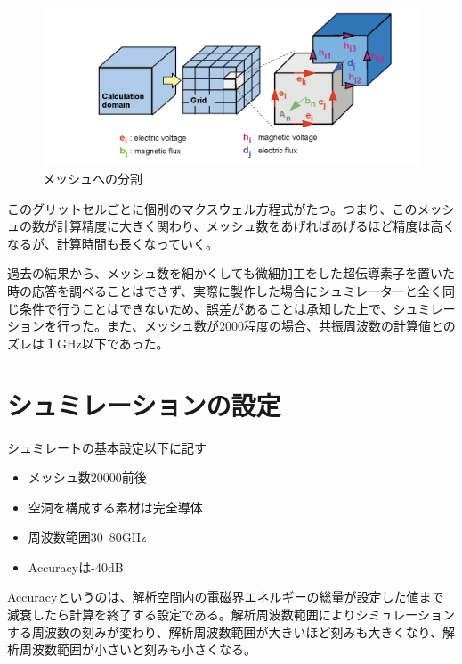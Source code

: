 \vspace{10 mm}

\begin{figure}[h]
  \begin{center}
    \includegraphics[width=12cm]{./image/mesh.png}
    \caption{メッシュへの分割}
    \label{fig:Mesh}
  \end{center}
\end{figure}

このグリットセルごとに個別のマクスウェル方程式がたつ。つまり、このメッシュの数が計算精度に大きく関わり、メッシュ数をあげればあげるほど精度は高くなるが、計算時間も長くなっていく。

過去の結果から、メッシュ数を細かくしても微細加工をした超伝導素子を置いた時の応答を調べることはできず、実際に製作した場合にシュミレーターと全く同じ条件で行うことはできないため、誤差があることは承知した上で、シュミレーションを行った。また、メッシュ数が2000程度の場合、共振周波数の計算値とのズレは１GHz以下であった。

\section{シュミレーションの設定}
シュミレートの基本設定以下に記す

\begin{itemize}
  \item メッシュ数20000前後
  \item 空洞を構成する素材は完全導体
  \item 周波数範囲30~80GHz
  \item Accuracyは-40dB
\end{itemize}

Accuracyというのは、解析空間内の電磁界エネルギーの総量が設定した値まで減衰したら計算を終了する設定である。解析周波数範囲によりシミュレーションする周波数の刻みが変わり、解析周波数範囲が大きいほど刻みも大きくなり、解析周波数範囲が小さいと刻みも小さくなる。
